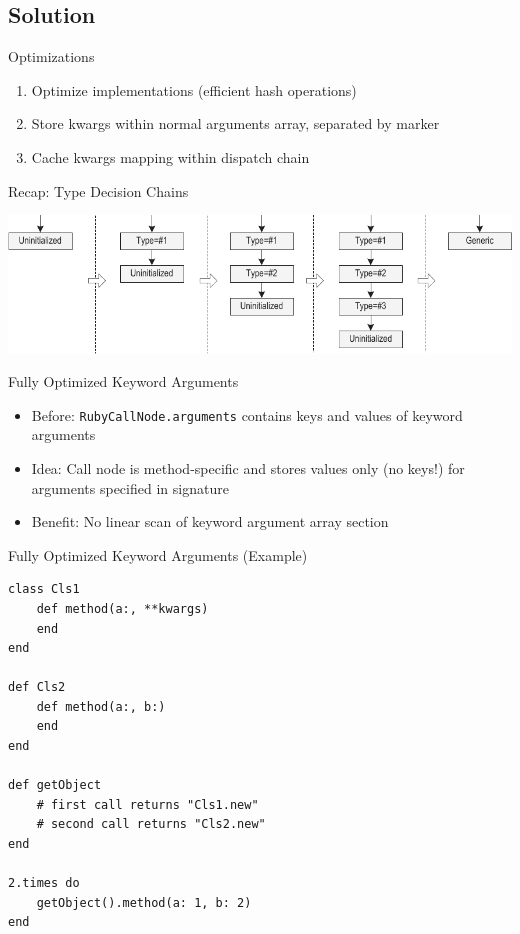 \documentclass[xcolor=dvipsname,handout]{beamer} %
\begin{document}
\subsection{Solution}
\begin{frame}{Optimizations}
\begin{enumerate}
 \item Optimize implementations (efficient hash operations)
 \item Store kwargs within normal arguments array, separated by marker
 \item Cache kwargs mapping within dispatch chain
\end{enumerate}
\end{frame}

\begin{frame}{Recap: Type Decision Chains}
\begin{table}
    \includegraphics[width=\textwidth]{type_chain.pdf}
\end{table}
\end{frame}

\begin{frame}{Fully Optimized Keyword Arguments}
\begin{itemize}
    \item Before: \lstinline{RubyCallNode.arguments} contains keys and values of keyword arguments
    \item Idea: Call node is method-specific and stores values only (no keys!) for arguments specified in signature
    \item Benefit: No linear scan of keyword argument array section
\end{itemize}
\end{frame}

\begin{frame}[fragile]{Fully Optimized Keyword Arguments (Example)}
\begin{lstlisting}
class Cls1
    def method(a:, **kwargs)
    end
end

def Cls2
    def method(a:, b:)
    end
end

def getObject
    # first call returns "Cls1.new"
    # second call returns "Cls2.new"
end

2.times do
    getObject().method(a: 1, b: 2)
end
\end{lstlisting}
\end{frame}
\end{document}
